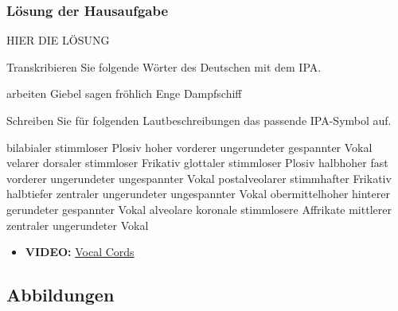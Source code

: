 {
\begin{frame}
\frametitle{Lösung der Hausaufgabe}

HIER DIE LÖSUNG

	Transkribieren Sie folgende Wörter des Deutschen mit dem IPA.

	\ea arbeiten
	\ex Giebel
	\ex sagen
	\ex fröhlich
	\ex Enge
	\ex Dampfschiff
	\z 

\end{frame}	

\begin{frame}

	Schreiben Sie für folgenden Lautbeschreibungen das passende IPA-Symbol auf.
	
	\ea bilabialer stimmloser Plosiv
	\ex hoher vorderer ungerundeter gespannter Vokal
	\ex velarer dorsaler stimmloser Frikativ
	\ex  glottaler stimmloser Plosiv
	\ex  halbhoher fast vorderer ungerundeter ungespannter Vokal
	\ex  postalveolarer stimmhafter Frikativ
	\ex  halbtiefer zentraler ungerundeter ungespannter Vokal
	\ex  obermittelhoher hinterer gerundeter gespannter Vokal
	\ex  alveolare koronale stimmlosere Affrikate
	\ex  mittlerer zentraler ungerundeter Vokal
	\z 

\end{frame}

\begin{frame}{\textipa{[ S l U s ]}}

\begin{itemize}
	\item \textbf{VIDEO:} \href{run:material/04vocalcordssinging.mp4}{Vocal Cords}
\end{itemize}

\end{frame}

}%



\subsection*{Abbildungen}


